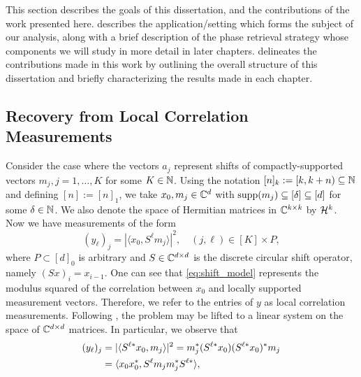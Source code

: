 This section describes the goals of this dissertation, and the contributions of the work presented here.   describes the application/setting which forms the subject of our analysis, along with a brief description of the phase retrieval strategy whose components we will study in more detail in later chapters.   delineates the contributions made in this work by outlining the overall structure of this dissertation and briefly characterizing the results made in each chapter.

\subsection{Recovery from Local Correlation Measurements}
\label{sec:locCorrMeas}
Consider the case where the vectors $a_j$ represent shifts of compactly-supported vectors $m_j, j = 1, \ldots, K$ for some $K \in \mathbb{N}$.  Using the notation $[n]_k:=[k, k + n)\subseteq \mathbb{N}$ and defining $[n]:=[n]_1$, we take $x_0, m_j \in \mathbb{C}^d$ with $\operatorname{supp}(m_j)\subseteq[\delta]\subseteq [d]$ for some $\delta \in \mathbb{N}$.  We also denote the space of Hermitian matrices in $\mathbb{C}^{k \times k}$ by $\mathcal{H}^k$.  Now we have measurements of the form \begin{equation} (y_\ell)_j = |\langle x_0, S^\ell m_j \rangle|^2, \quad (j, \ell) \in [K] \times P, \label{eq:shift_model} \end{equation} where $P \subset [d]_0$ is arbitrary and $S \in \mathbb{C}^{d \times d}$ is the discrete circular shift operator, namely $(S x)_i = x_{i-1}$.  One can see that \eqref{eq:shift_model} represents the modulus squared of the correlation between $x_0$ and locally supported measurement vectors.  Therefore, we refer to the entries of $y$ as local correlation measurements.  Following \cite{balan2006signal,candes2012phaselift,IVW2015_FastPhase}, the problem may be lifted to a linear system on the space of $\mathbb{C}^{d \times d}$ matrices.  In particular, we observe that
\begin{align*}
	(y_\ell)_j &= \lvert\langle S^{\ell *} x_0, m_j\rangle\rvert^2 = m_j^* (S^{\ell *} x_0) (S^{\ell *} x_0)^* m_j \\
	&= \langle x_0 x_0^*, S^\ell m_j m_j^* S^{\ell *}\rangle,
\end{align*}
